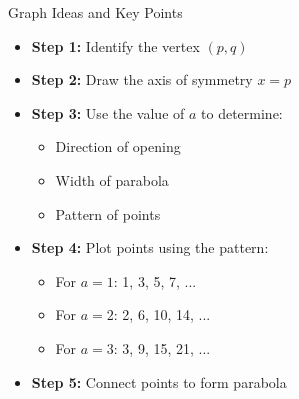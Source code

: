 \documentclass[aspectratio=169]{beamer}
\begin{document}
\begin{frame}{Graph Ideas and Key Points}
    \begin{tcolorbox}[colback=lightgray,colframe=primary,title=Graphing Strategy]
        \footnotesize
        \begin{itemize}
            \item \textbf{Step 1:} Identify the vertex $(p,q)$
            \item \textbf{Step 2:} Draw the axis of symmetry $x = p$
            \item \textbf{Step 3:} Use the value of $a$ to determine:
                \begin{itemize}
                    \item Direction of opening
                    \item Width of parabola
                    \item Pattern of points
                \end{itemize}
            \item \textbf{Step 4:} Plot points using the pattern:
                \begin{itemize}
                    \item For $a=1$: 1, 3, 5, 7, ...
                    \item For $a=2$: 2, 6, 10, 14, ...
                    \item For $a=3$: 3, 9, 15, 21, ...
                \end{itemize}
            \item \textbf{Step 5:} Connect points to form parabola
        \end{itemize}
    \end{tcolorbox}
\end{frame}
\end{document}
